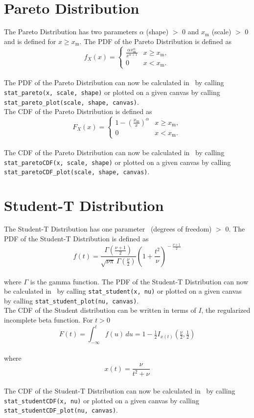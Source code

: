 	\section{Pareto Distribution}
	
		The Pareto Distribution has two parameters $\alpha$ (shape) $>$ 0 and $x_\mathrm{m}$ (scale) $>$ 0 and is defined for $x \geq x_\mathrm{m}$. The \ac{PDF} of the Pareto Distribution is defined as
		\\[0.3cm]
		$$f_X(x)= \begin{cases} \frac{\alpha x_\mathrm{m}^\alpha}{x^{\alpha+1}} & x \ge x_\mathrm{m}, \\ 0 & x < x_\mathrm{m}. \end{cases}$$
		\\[0.3cm]
		The \ac{PDF} of the Pareto Distribution can now be calculated in \setlx\ by calling \lstinline{stat_pareto(x, scale, shape)} or plotted on a given canvas by calling \lstinline{stat_pareto_plot(scale, shape, canvas)}.
		\\[0.3cm]
		The \ac{CDF} of the Pareto Distribution is defined as
		\\[0.3cm]
		$$F_X(x) = \begin{cases}1-\left(\frac{x_\mathrm{m}}{x}\right)^\alpha & x \ge x_\mathrm{m}, \\0 & x < x_\mathrm{m}.\end{cases}$$
		\\[0.3cm]
		The \ac{CDF} of the Pareto Distribution can now be calculated in \setlx\ by calling \lstinline{stat_paretoCDF(x, scale, shape)} or plotted on a given canvas by calling \lstinline{stat_paretoCDF_plot(scale, shape, canvas)}.
		
	\section{Student-T Distribution}
	
		The Student-T Distribution has one parameter \nu\ (degrees of freedom) $>$ 0. The \ac{PDF} of the Student-T Distribution is defined as
		\\[0.3cm]
		$$f(t) = \frac{\Gamma(\frac{\nu+1}{2})} {\sqrt{\nu\pi}\,\Gamma(\frac{\nu}{2})} \left(1+\frac{t^2}{\nu} \right)^{\!-\frac{\nu+1}{2}}$$
		\\[0.3cm]
		where $\Gamma$ is the gamma function. The \ac{PDF} of the Student-T Distribution can now be calculated in \setlx\ by calling \lstinline{stat_student(x, nu)} or plotted on a given canvas by calling \lstinline{stat_student_plot(nu, canvas)}.
		\\[0.3cm]
		The \ac{CDF} of the Student distribution can be written in terms of $I$, the regularized incomplete beta function. For $t > 0$
		\\[0.3cm]
		$$F(t) = \int_{-\infty}^t f(u)\,du = 1 - \tfrac{1}{2} I_{x(t)}\left(\tfrac{\nu}{2}, \tfrac{1}{2}\right)$$
		\\[0.3cm]
		where $$x(t) = \frac{\nu}{{t^2+\nu}}$$
		\\[0.3cm]
		The \ac{CDF} of the Student-T Distribution can now be calculated in \setlx\ by calling \lstinline{stat_studentCDF(x, nu)} or plotted on a given canvas by calling \lstinline{stat_studentCDF_plot(nu, canvas)}.
		

